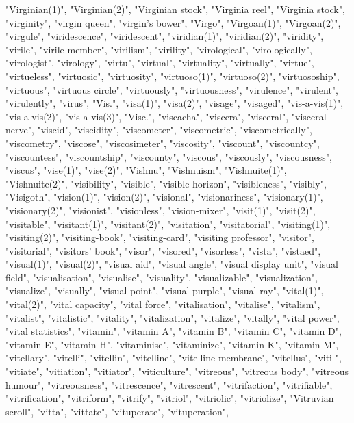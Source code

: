 "Virginian(1)",
"Virginian(2)",
"Virginian stock",
"Virginia reel",
"Virginia stock",
"virginity",
"virgin queen",
"virgin's bower",
"Virgo",
"Virgoan(1)",
"Virgoan(2)",
"virgule",
"viridescence",
"viridescent",
"viridian(1)",
"viridian(2)",
"viridity",
"virile",
"virile member",
"virilism",
"virility",
"virological",
"virologically",
"virologist",
"virology",
"virtu",
"virtual",
"virtuality",
"virtually",
"virtue",
"virtueless",
"virtuosic",
"virtuosity",
"virtuoso(1)",
"virtuoso(2)",
"virtuosoship",
"virtuous",
"virtuous circle",
"virtuously",
"virtuousness",
"virulence",
"virulent",
"virulently",
"virus",
"Vis.",
"visa(1)",
"visa(2)",
"visage",
"visaged",
"vis-a-vis(1)",
"vis-a-vis(2)",
"vis-a-vis(3)",
"Visc.",
"viscacha",
"viscera",
"visceral",
"visceral nerve",
"viscid",
"viscidity",
"viscometer",
"viscometric",
"viscometrically",
"viscometry",
"viscose",
"viscosimeter",
"viscosity",
"viscount",
"viscountcy",
"viscountess",
"viscountship",
"viscounty",
"viscous",
"viscously",
"viscousness",
"viscus",
"vise(1)",
"vise(2)",
"Vishnu",
"Vishnuism",
"Vishnuite(1)",
"Vishnuite(2)",
"visibility",
"visible",
"visible horizon",
"visibleness",
"visibly",
"Visigoth",
"vision(1)",
"vision(2)",
"visional",
"visionariness",
"visionary(1)",
"visionary(2)",
"visionist",
"visionless",
"vision-mixer",
"visit(1)",
"visit(2)",
"visitable",
"visitant(1)",
"visitant(2)",
"visitation",
"visitatorial",
"visiting(1)",
"visiting(2)",
"visiting-book",
"visiting-card",
"visiting professor",
"visitor",
"visitorial",
"visitors' book",
"visor",
"visored",
"visorless",
"vista",
"vistaed",
"visual(1)",
"visual(2)",
"visual aid",
"visual angle",
"visual display unit",
"visual field",
"visualisation",
"visualise",
"visuality",
"visualizable",
"visualization",
"visualize",
"visually",
"visual point",
"visual purple",
"visual ray",
"vital(1)",
"vital(2)",
"vital capacity",
"vital force",
"vitalisation",
"vitalise",
"vitalism",
"vitalist",
"vitalistic",
"vitality",
"vitalization",
"vitalize",
"vitally",
"vital power",
"vital statistics",
"vitamin",
"vitamin A",
"vitamin B",
"vitamin C",
"vitamin D",
"vitamin E",
"vitamin H",
"vitaminise",
"vitaminize",
"vitamin K",
"vitamin M",
"vitellary",
"vitelli",
"vitellin",
"vitelline",
"vitelline membrane",
"vitellus",
"viti-",
"vitiate",
"vitiation",
"vitiator",
"viticulture",
"vitreous",
"vitreous body",
"vitreous humour",
"vitreousness",
"vitrescence",
"vitrescent",
"vitrifaction",
"vitrifiable",
"vitrification",
"vitriform",
"vitrify",
"vitriol",
"vitriolic",
"vitriolize",
"Vitruvian scroll",
"vitta",
"vittate",
"vituperate",
"vituperation",
